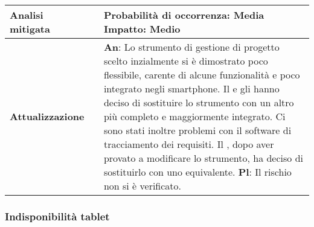 \begin{table}[H]
\begin{center}
\begin{tabular}{p{2.5cm}p{0.5cm}p{11cm}}
					\midrule
						\textbf{Analisi \newline mitigata}
						& &
						\textbf{Probabilità di occorrenza}: Media
						\newline
						\textbf{Impatto}: Medio
					\\
					\midrule
						\textbf{Attualizzazione}
						& &
						\textbf{An}: Lo strumento di gestione di progetto scelto inzialmente si è dimostrato poco flessibile, carente di alcune funzionalità e poco integrato negli smartphone. Il \responsabilediprogetto{} e gli \amministratori{} hanno deciso di sostituire lo strumento con un altro più completo e maggiormente integrato. Ci sono stati inoltre problemi con il software di tracciamento dei requisiti. Il \responsabilediprogetto, dopo aver provato a modificare lo strumento, ha deciso di sostituirlo con uno equivalente.
						\newline
						\textbf{Pl}: Il rischio non si è verificato.
					\\
					
					\bottomrule	
					\end{tabular}
					\end{center}
					\end{table}			

	\newpage
		\subsubsection{Indisponibilità tablet}
		\label{subsec:indisponibilitaTablet}
		
